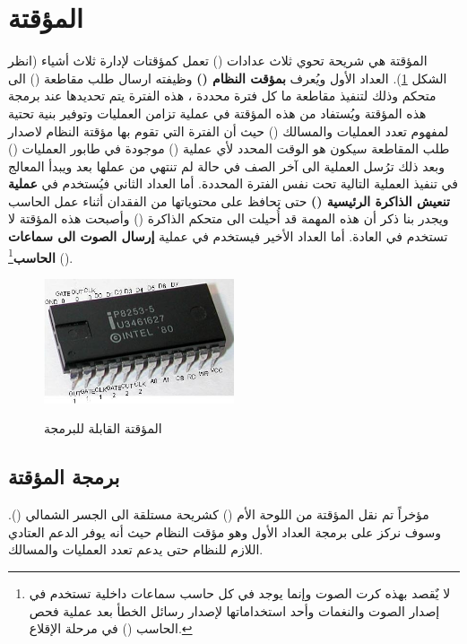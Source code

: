 \documentclass[document.tex]{subfiles}
\begin{document}
\section{المؤقتة }
المؤقتة هي شريحة  تحوي ثلاث عدادات () تعمل كمؤقتات لإدارة ثلاث أشياء (انظر الشكل \ref{fig:pit}). العداد الأول ويُعرف \textbf{بمؤقت النظام ()} وظيفته ارسال طلب مقاطعة () الى متحكم  وذلك لتنفيذ مقاطعة ما كل فترة محددة ، هذه الفترة يتم تحديدها عند برمجة هذه المؤقتة ويُستفاد من هذه المؤقتة في عملية تزامن العمليات وتوفير بنية تحتية لمفهوم تعدد العمليات والمسالك () حيث أن الفترة التي تقوم بها مؤقتة النظام لاصدار طلب المقاطعة سيكون هو الوقت المحدد لأي عملية () موجودة في طابور العمليات () وبعد ذلك ترُسل العملية الى آخر الصف في حالة لم تنتهي من عملها بعد ويبدأ المعالج في تنفيذ العملية التالية تحت نفس الفترة المحددة.  أما العداد الثاني فيُستخدم في \textbf{عملية تنعيش الذاكرة الرئيسية ()} حتى تحافظ على محتوياتها من الفقدان أثناء عمل الحاسب ويجدر بنا ذكر أن هذه المهمة قد أُحيلت الى متحكم الذاكرة () وأصبحت هذه المؤقتة لا تستخدم في العادة. أما العداد الأخير فيستخدم في عملية \textbf{إرسال الصوت الى سماعات الحاسب}\footnote{لا يٌقصد بهذه كرت الصوت وإنما يوجد في كل حاسب سماعات داخلية تستخدم في إصدار الصوت والنغمات وأحد استخداماتها لإصدار رسائل الخطأ بعد عملية فحص الحاسب () في مرحلة الإقلاع.} ().

\begin{figure}[h!]
  \caption{المؤقتة القابلة للبرمجة }
  \centering
   \includegraphics[width=0.5\textwidth]{../img/Intel-P8253-5}
  \label{fig:pit} 
\end{figure}

\subsection{برمجة المؤقتة }
مؤخراً تم نقل المؤقتة من اللوحة الأم () كشريحة  مستلقة الى الجسر الشمالي (). وسوف نركز على برمجة العداد الأول وهو مؤقت النظام حيث أنه يوفر الدعم العتادي اللازم للنظام حتى يدعم تعدد العمليات والمسالك.
\end{document}
